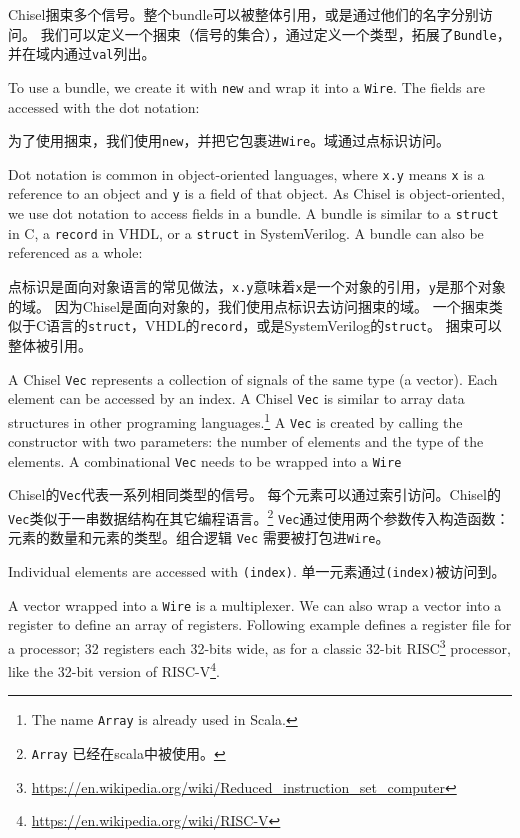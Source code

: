 \documentclass[%
    10pt,
    headinclude, footexclude,
    openright, %
    notitlepage,
    cleardoubleempty,
    headsepline,
    pointlessnumbers,
    bibtotoc, idxtotoc,
    ]{scrbook}
\newcommand{\code}[1]{{\small{\texttt{#1}}}}
\newcommand{\codefoot}[1]{{\footnotesize{\texttt{#1}}}}
\newcommand{\myref}[2]{\href{#1}{#2}}
\renewcommand{\myref}[2]{{#2}{\footnote{\url{#1}}}}
\begin{document}
Chisel捆束多个信号。整个bundle可以被整体引用，或是通过他们的名字分别访问。
我们可以定义一个捆束（信号的集合），通过定义一个类型，拓展了\code{Bundle}，
并在域内通过\code{val}列出。



\noindent To use a bundle, we create it with \code{new} and wrap it into a \code{Wire}.
The fields are accessed with the dot notation:

\noindent 为了使用捆束，我们使用\code{new}，并把它包裹进\code{Wire}。域通过点标识访问。



Dot notation is common in object-oriented languages, where \code{x.y} means
\code{x} is a reference to an object and \code{y} is a field of that object.
As Chisel is object-oriented, we use dot notation to access fields in a bundle.
A bundle is similar to a \code{struct} in C, a \code{record} in VHDL, or a
\code{struct} in SystemVerilog.
A bundle can also be referenced as a whole:

点标识是面向对象语言的常见做法，\code{x.y}意味着\code{x}是一个对象的引用，\code{y}是那个对象的域。
因为Chisel是面向对象的，我们使用点标识去访问捆束的域。
一个捆束类似于C语言的\code{struct}，VHDL的\code{record}，或是SystemVerilog的\code{struct}。
捆束可以整体被引用。


A Chisel \code{Vec} represents a collection of signals of the same type (a vector).
Each element can be accessed by an index. A Chisel \code{Vec} is similar
to array data structures in other programing languages.\footnote{The name \codefoot{Array}
is already used in Scala.}
A \code{Vec} is created by calling the constructor with two parameters: the
number of elements and the type of the elements. A combinational \code{Vec}
needs to be wrapped into a \code{Wire}

Chisel的\code{Vec}代表一系列相同类型的信号。
每个元素可以通过索引访问。Chisel的\code{Vec}类似于一串数据结构在其它编程语言。\footnote{ \codefoot{Array}
已经在scala中被使用。}
\code{Vec}通过使用两个参数传入构造函数：元素的数量和元素的类型。组合逻辑 \code{Vec}
需要被打包进\code{Wire}。


\noindent Individual elements are accessed with \code{(index)}.
\noindent 单一元素通过\code{(index)}被访问到。


A vector wrapped into a \code{Wire} is a multiplexer.
We can also wrap a vector into a register to define an array of registers.
Following example defines a register file for a processor; 32 registers
each 32-bits wide, as for a classic 32-bit 
\myref{https://en.wikipedia.org/wiki/Reduced_instruction_set_computer}{RISC}
processor, like the 32-bit version of \myref{https://en.wikipedia.org/wiki/RISC-V}{RISC-V}.
\end{document}

